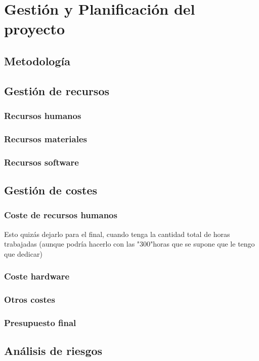 \chapter{Gestión y Planificación del proyecto}



\section{Metodología}


\section{Gestión de recursos}

\subsection{Recursos humanos}

\subsection{Recursos materiales}

\subsection{Recursos software}

\section{Gestión de costes}

\subsection{Coste de recursos humanos}
Esto quizás dejarlo para el final, cuando tenga la cantidad total de horas trabajadas (aunque podría hacerlo con las "300"horas que se supone que le tengo que dedicar)


\subsection{Coste hardware}

\subsection{Otros costes}

\subsection{Presupuesto final}


\section{Análisis de riesgos}



